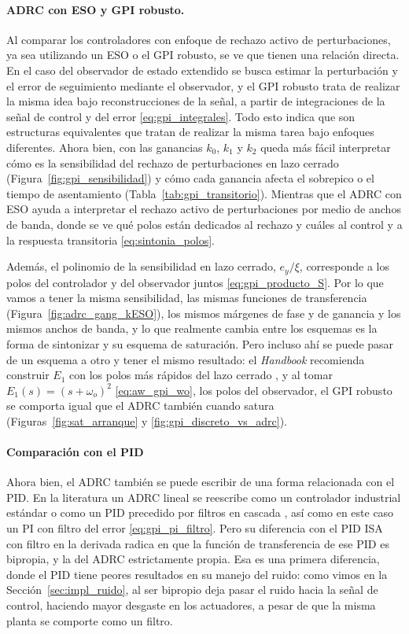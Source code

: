 \paragraph{ADRC con ESO y GPI robusto.} Al comparar los controladores con enfoque de rechazo activo de
perturbaciones, ya sea utilizando un ESO o el GPI robusto, se ve que tienen una relación directa. En el caso
del observador de estado extendido se busca estimar la perturbación y el error de seguimiento mediante
el observador, y el GPI robusto trata de realizar la misma idea bajo reconstrucciones de la señal, a partir de
integraciones de la señal de control y del error \eqref{eq:gpi_integrales}. Todo esto indica que son
estructuras equivalentes que tratan de realizar la misma tarea bajo enfoques diferentes. Ahora bien, con las ganancias $k_0$, $k_1$ y $k_2$ queda más
fácil interpretar cómo es la sensibilidad del rechazo de perturbaciones en lazo cerrado
(Figura~\ref{fig:gpi_sensibilidad}) y cómo cada ganancia afecta el sobrepico o el tiempo de
asentamiento (Tabla~\ref{tab:gpi_transitorio}). Mientras que el ADRC con ESO ayuda a interpretar el
rechazo activo de perturbaciones por medio de anchos de banda, donde se ve qué polos están dedicados al
rechazo y cuáles al control y a la respuesta transitoria \eqref{eq:sintonia_polos}.

Además, el polinomio de la sensibilidad en lazo cerrado, $e_y/\xi$, corresponde a los polos del
controlador y del observador juntos \eqref{eq:gpi_producto_S}. Por lo que vamos a tener la misma
sensibilidad, las mismas funciones de transferencia (Figura~\ref{fig:adrc_gang_kESO}), los mismos
márgenes de fase y de ganancia y los mismos anchos de banda, y lo que realmente cambia entre los
esquemas es la forma de sintonizar y su esquema de saturación. Pero incluso ahí se puede pasar de un
esquema a otro y tener el mismo resultado: el \emph{Handbook} recomienda construir $E_1$ con los polos
más rápidos del lazo cerrado \cite[ec.~19.3]{levine2011handbook}, y al tomar
$E_1(s) = (s + \omega_o)^2$ \eqref{eq:aw_gpi_wo}, los polos del observador, el GPI robusto se comporta igual que
el ADRC también cuando satura (Figuras~\ref{fig:sat_arranque} y \ref{fig:gpi_discreto_vs_adrc}).

\paragraph{Comparación con el PID}
\label{sec:por_que}

Ahora bien, el ADRC también se puede escribir de una forma relacionada con el PID. En la literatura un
ADRC lineal se reescribe como un controlador industrial estándar \cite{stankovic2024pid} o como un PID
precedido por filtros en cascada \cite{cao2025cascaded}, así como en este caso un PI con filtro del
error \eqref{eq:gpi_pi_filtro}. Pero su diferencia con el PID ISA con filtro en la derivada radica en
que la función de transferencia de ese PID es bipropia, y la del ADRC estrictamente propia. Esa es una
primera diferencia, donde el PID tiene peores resultados en su manejo del ruido: como vimos en la
Sección~\ref{sec:impl_ruido}, al ser bipropio deja pasar el ruido hacia la señal de control, haciendo mayor
desgaste en los actuadores, a pesar de que la misma planta se comporte como un filtro.

